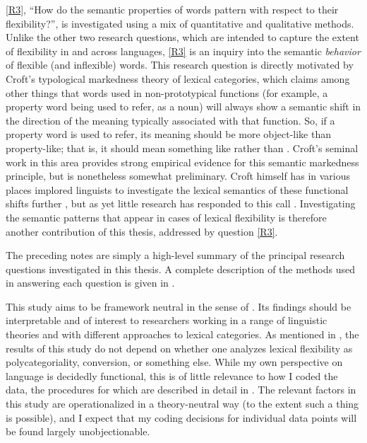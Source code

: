 \ref{R3}, \enquote{How do the semantic properties of words pattern with respect to their flexibility?}, is investigated using a mix of quantitative and qualitative methods. Unlike the other two research questions, which are intended to capture the extent of flexibility in and across languages, \ref{R3} is an inquiry into the semantic \emph{behavior} of flexible (and inflexible) words. This research question is directly motivated by Croft's \parencites*{Croft1991}{Croft2000}{Croft2001}{Croftforthcoming} typological markedness theory of lexical categories, which claims among other things that words used in non-prototypical functions (for example, a property word being used to refer, as a noun) will always show a semantic shift in the direction of the meaning typically associated with that function. So, if a property word is used to refer, its meaning should be more object-like than property-like; that is, it should mean something like  rather than . Croft's \parencite*{Croft1991} seminal work in this area provides strong empirical evidence for this semantic markedness principle, but is nonetheless somewhat preliminary. Croft himself has in various places implored linguists to investigate the lexical semantics of these functional shifts further \parencites[440]{Croft2005}[70]{CroftvanLier2012}, but as yet little research has responded to this call . Investigating the semantic patterns that appear in cases of lexical flexibility is therefore another contribution of this thesis, addressed by question \ref{R3}.

The preceding notes are simply a high-level summary of the principal research questions investigated in this thesis. A complete description of the methods used in answering each question is given in .

This study aims to be framework neutral in the sense of \textcite{Haspelmath2010b}. Its findings should be interpretable and of interest to researchers working in a range of linguistic theories and with different approaches to lexical categories. As mentioned in , the results of this study do not depend on whether one analyzes lexical flexibility as polycategoriality, conversion, or something else. While my own perspective on language is decidedly functional, this is of little relevance to how I coded the data, the procedures for which are described in detail in . The relevant factors in this study are operationalized in a theory-neutral way (to the extent such a thing is possible), and I expect that my coding decisions for individual data points will be found largely unobjectionable.

